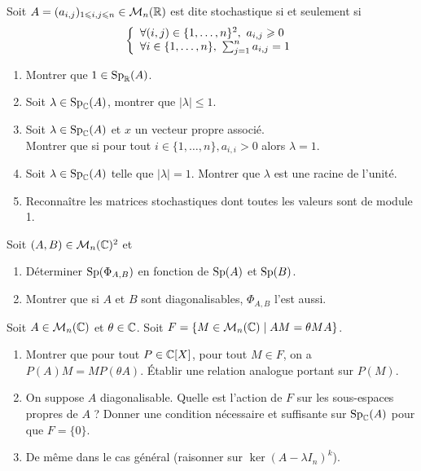 \begin{exercise}
	Soit $A=(a_{i,j})_{1\leqslant i,j\leqslant n}\in\mathcal{M}_{n}(\mathbb{R})$ est dite stochastique si et seulement si
	$$
	\left\{
		\begin{array}[]{l}
			\forall(i,j)\in\{1,\dots,n\}^{2},~a_{i,j}\geqslant0\\
			\forall
			i\in\{1,\dots,n\},~\sum_{j=1}^{n}a_{i,j}=1
		\end{array}
	\right.
	$$
	\begin{enumerate}
		\item Montrer que $1\in\operatorname{Sp}_{\mathbb{R}}(A)$.
		\item Soit $\lambda\in\operatorname{Sp}_{\mathbb{C}}(A)$, montrer que $\vert\lambda\vert\leqslant1$.
		\item Soit $\lambda\in\operatorname{Sp}_{\mathbb{C}}(A)$ et $x$ un vecteur propre associé.\\
		Montrer que si pour tout $i\in\{1,\dots,n\}, a_{i,i}>0$ alors $\lambda=1$.
		\item Soit $\lambda\in\operatorname{Sp}_{\mathbb{C}}(A)$ telle que $\vert \lambda\vert=1$. Montrer que $\lambda$ est une racine de l'unité.
		\item Reconnaître les matrices stochastiques dont toutes les valeurs sont de module 1.
	\end{enumerate}
\end{exercise}

\begin{exercise}
	Soit $(A,B)\in\mathcal{M}_{n}(\mathbb{C})^{2}$ et 
	\begin{enumerate}
		\item Déterminer $\operatorname{Sp}(\Phi_{A,B})$ en fonction de $\operatorname{Sp}(A)$ et $\operatorname{Sp}(B)$.
		\item Montrer que si $A$ et $B$ sont diagonalisables, $\Phi_{A,B}$ l'est aussi.
	\end{enumerate}
\end{exercise}

\begin{exercise}
	Soit $A\in\mathcal{M}_{n}(\mathbb{C})$ et $\theta\in\mathbb{C}$. Soit $F=\{M\in\mathcal{M}_{n}(\mathbb{C})\mid AM=\theta MA\}$.
	\begin{enumerate}
		\item Montrer que pour tout $P\in\mathbb{C}[X]$, pour tout $M\in F$, on a $P(A)M=MP(\theta A)$. Établir une relation analogue portant sur $P(M)$.
		\item On suppose $A$ diagonalisable. Quelle est l'action de $F$ sur les sous-espaces propres de $A$ ? Donner une condition nécessaire et suffisante sur $\operatorname{Sp}_{\mathbb{C}}(A)$ pour que $F=\{0\}$.
		\item De même dans le cas général (raisonner sur $\ker(A-\lambda I_{n})^{k}$).
	\end{enumerate}
\end{exercise}

